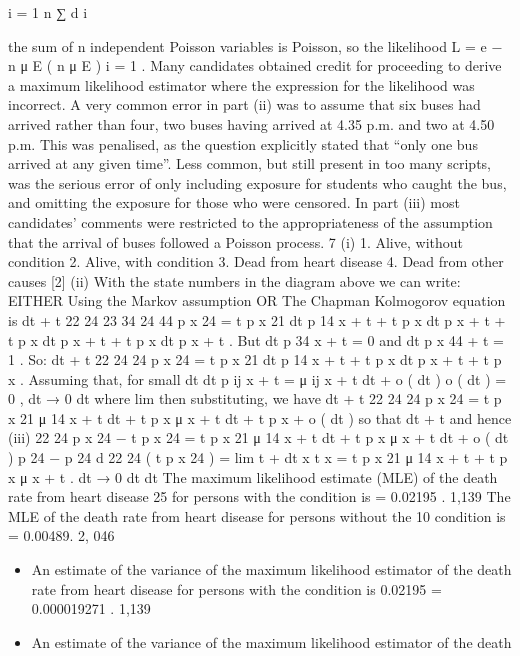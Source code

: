 \documentclass[a4paper,12pt]{article}
\begin{document}
\begin{enumerate}
\begin{itemize}
i = 1
n
∑ d i
\end{itemize}
the sum of n independent Poisson variables is Poisson, so the likelihood L = e − n μ E ( n μ E ) i = 1 .
Many candidates obtained credit for proceeding to derive a maximum likelihood estimator
where the expression for the likelihood was incorrect.
A very common error in part (ii) was to assume that six buses had arrived rather than four,
two buses having arrived at 4.35 p.m. and two at 4.50 p.m. This was penalised, as the
question explicitly stated that “only one bus arrived at any given time”. Less common, but
still present in too many scripts, was the serious error of only including exposure for students
who caught the bus, and omitting the exposure for those who were censored. In part (iii)
most candidates’ comments were restricted to the appropriateness of the assumption that the
arrival of buses followed a Poisson process.
7
(i)
1. Alive, without
condition 2. Alive, with
condition
3. Dead from heart
disease 4. Dead from other
causes
[2]
(ii)
With the state numbers in the diagram above we can write:
EITHER
Using the Markov assumption
OR
The Chapman Kolmogorov equation is
dt + t 22
24
23
34
24
44
p x 24 = t p x 21 dt p 14
x + t + t p x dt p x + t + t p x dt p x + t + t p x dt p x + t .
But dt
p 34
x + t = 0
and dt
p x 44 + t = 1 .
So:
dt + t
22
24
24
p x 24 = t p x 21 dt p 14
x + t + t p x dt p x + t + t p x .
Assuming that, for small dt
dt
p ij x + t = μ ij x + t dt + o ( dt )
o ( dt )
= 0 ,
dt → 0 dt
where lim
then substituting, we have
dt + t
22 24
24
p x 24 = t p x 21 μ 14
x + t dt + t p x μ x + t dt + t p x + o ( dt )
so that
dt + t
and hence
(iii)
22 24
p x 24 − t p x 24 = t p x 21 μ 14
x + t dt + t p x μ x + t dt + o ( dt )
p 24 − p 24
d
22 24
( t p x 24 ) = lim t + dt x t x = t p x 21 μ 14
x + t + t p x μ x + t .
dt → 0
dt
dt
The maximum likelihood estimate (MLE) of the death rate from heart disease
25
for persons with the condition is
= 0.02195 .
1,139
The MLE of the death rate from heart disease for persons without the
10
condition is
= 0.00489.
2, 046
\begin{itemize}
\item An estimate of the variance of the maximum likelihood estimator of the death
rate from heart disease for persons with the condition is
0.02195
= 0.000019271 .
1,139
\item An estimate of the variance of the maximum likelihood estimator of the death

\end{itemize}
\end{enumerate}
\end{document}
